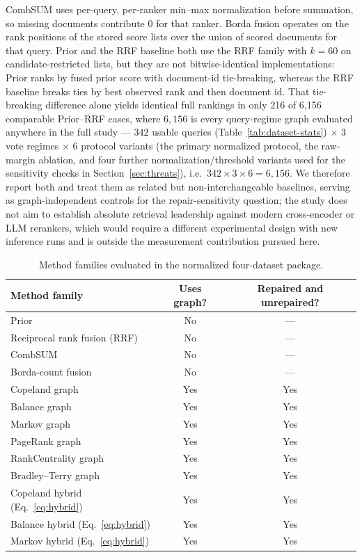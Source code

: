 \documentclass[manuscript,anonymous,review]{acmart}
\begin{document}
CombSUM uses per-query, per-ranker min--max normalization before summation, so
missing documents contribute $0$ for that ranker. Borda fusion operates on the
rank positions of the stored score lists over the union of scored documents for
that query. Prior and the RRF baseline both use the RRF family with $k=60$ on
candidate-restricted lists, but they are not bitwise-identical implementations:
Prior ranks by fused prior score with document-id tie-breaking, whereas the RRF
baseline breaks ties by best observed rank and then document id. That
tie-breaking difference alone yields identical full rankings in only 216 of
6{,}156 comparable Prior--RRF cases, where $6{,}156$ is every query-regime
graph evaluated anywhere in the full study --- $342$ usable queries
(Table~\ref{tab:dataset-stats}) $\times$ $3$ vote regimes $\times$ $6$
protocol variants (the primary normalized protocol, the raw-margin ablation,
and four further normalization/threshold variants used for the sensitivity
checks in Section~\ref{sec:threats}), i.e.\ $342\times3\times6=6{,}156$. We
therefore report both and treat them as related but non-interchangeable
baselines, serving as graph-independent controls for the repair-sensitivity
question; the study does not aim to establish absolute retrieval leadership
against modern cross-encoder or LLM rerankers, which would require a
different experimental design with new inference runs and is outside the
measurement contribution pursued here.

\begin{table}[t]
  \caption{Method families evaluated in the normalized four-dataset package.}
  \label{tab:baselines}
  \begin{tabular}{lcc}
    \toprule
    Method family & Uses graph? & Repaired and unrepaired? \\
    \midrule
    Prior & No & --- \\
    Reciprocal rank fusion (RRF) & No & --- \\
    CombSUM & No & --- \\
    Borda-count fusion & No & --- \\
    Copeland graph & Yes & Yes \\
    Balance graph & Yes & Yes \\
    Markov graph & Yes & Yes \\
    PageRank graph & Yes & Yes \\
    RankCentrality graph & Yes & Yes \\
    Bradley--Terry graph & Yes & Yes \\
    Copeland hybrid (Eq.~\eqref{eq:hybrid}) & Yes & Yes \\
    Balance hybrid (Eq.~\eqref{eq:hybrid}) & Yes & Yes \\
    Markov hybrid (Eq.~\eqref{eq:hybrid}) & Yes & Yes \\
    \bottomrule
  \end{tabular}
\end{table}
\end{document}
